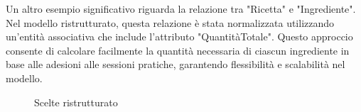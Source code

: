 Un altro esempio significativo riguarda la relazione tra "Ricetta" e "Ingrediente". Nel modello ristrutturato, questa relazione è stata normalizzata utilizzando un'entità associativa che include l'attributo "QuantitàTotale". Questo approccio consente di calcolare facilmente la quantità necessaria di ciascun ingrediente in base alle adesioni alle sessioni pratiche, garantendo flessibilità e scalabilità nel modello.
\begin{figure}[H]
    \noindent{}
    \caption{Scelte ristrutturato}
\end{figure}